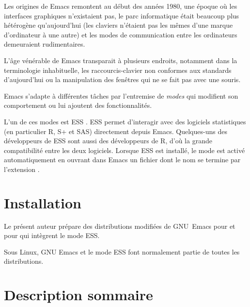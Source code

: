 Les origines de Emacs remontent au début des années 1980, une époque
où les interfaces graphiques n'existaient pas, le parc informatique
était beaucoup plus hétérogène qu'aujourd'hui (les claviers n'étaient
pas les mêmes d'une marque d'ordinateur à une autre) et les modes de
communication entre les ordinateurs demeuraient rudimentaires.

L'âge vénérable de Emacs transparait à plusieurs endroits, notamment
dans la terminologie inhabituelle, les raccourcis-clavier non
conformes aux standards d'aujourd'hui ou la manipulation des fenêtres
qui ne se fait pas avec une souris.

Emacs s'adapte à différentes tâches par l'entremise de \emph{modes}
qui modifient son comportement ou lui ajoutent des fonctionnalités.

L'un de ces modes est ESS \citep[\emph{Emacs Speaks
  Statistics},][]{ESS}. ESS permet d'interagir avec des logiciels
statistiques (en particulier R, S+ et SAS) directement depuis Emacs.
Quelques-uns des développeurs de ESS sont aussi des développeurs de R,
d'où la grande compatibilité entre les deux logiciels. Lorsque ESS est
installé, le mode est activé automatiquement en ouvrant dans Emacs un
fichier dont le nom se termine par l'extension .


\section{Installation}
\label{sec:emacs+ess:installation}

Le présent auteur prépare des distributions modifiées de GNU~Emacs
pour 
et pour 
qui intègrent le mode ESS.

Sous Linux, GNU Emacs et le mode ESS font normalement partie de toutes
les distributions.

\section{Description sommaire}
\label{sec:emacs+ess:description}

